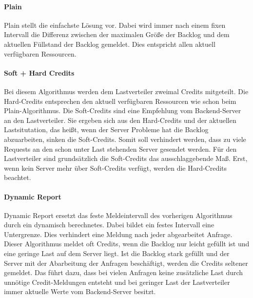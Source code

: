 \documentclass[a4paper, 12pt, BCOR10mm, DIV12, toc=bibliography, toc=listof, german]{scrbook}
\begin{document}
			\paragraph{Plain} %
			\label{par:plain}

				Plain stellt die einfachste Lösung vor. Dabei wird immer nach einem fixen Intervall die
				Differenz zwischen der maximalen Größe der Backlog und dem aktuellen Füllstand der Backlog
				gemeldet. Dies entspricht allen aktuell verfügbaren Ressourcen.


			\paragraph{Soft + Hard Credits} %
			\label{par:soft-hard-credits}

			Bei diesem Algorithmus werden dem Lastverteiler zweimal Credits mitgeteilt. Die Hard-Credits
			entsprechen den aktuell verfügbaren Ressourcen wie schon beim Plain-Algorithmus. Die Soft-Credits
			sind eine Empfehlung vom Backend-Server an den Lastverteiler. Sie ergeben sich aus den
			Hard-Credits und der aktuellen Lastsitutation, das heißt, wenn der Server Probleme hat die Backlog
			abzuarbeiten, sinken die Soft-Credits. Somit soll verhindert werden, dass zu viele Requests an den
			schon unter Last stehenden Server gesendet werden. Für den Lastverteiler sind grundsätzlich die
			Soft-Credits das ausschlaggebende Maß. Erst, wenn kein Server mehr über Soft-Credits verfügt,
			werden die Hard-Credits beachtet.


			\paragraph{Dynamic Report} %
			\label{par:dynamic-report}

			Dynamic Report ersetzt das feste Meldeintervall des vorherigen Algorithmus durch ein dynamisch
			berechnetes. Dabei bildet ein festes Intervall eine Untergrenze. Dies verhindert eine Meldung nach
			jeder abgearbeitet Anfrage. Dieser Algorithmus meldet oft Credits, wenn die Backlog nur leicht
			gefüllt ist und eine geringe Last	auf dem Server liegt. Ist die Backlog stark gefüllt und der
			Server mit der Abarbeitung der Anfragen beschäftigt, werden die Credits seltener gemeldet. Das
			führt dazu, dass bei vielen Anfragen keine zusätzliche Last durch unnötige Credit-Meldungen entsteht
			und bei geringer Last der Lastverteiler immer aktuelle Werte vom Backend-Server besitzt.
\end{document}
